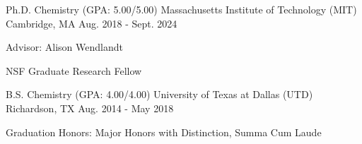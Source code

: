 

\begin{cventries}

  \cventry
    {Ph.D. Chemistry (GPA: 5.00/5.00)} %
    {Massachusetts Institute of Technology (MIT)} %
    {Cambridge, MA} %
    {Aug. 2018 - Sept. 2024} %
    {
      \begin{cvitems} %
        \item[] {Advisor: Alison Wendlandt}
        \item[] {NSF Graduate Research Fellow}
      \end{cvitems}
    }
    

\cventry
    {B.S. Chemistry (GPA: 4.00/4.00)} %
    {University of Texas at Dallas (UTD)} %
    {Richardson, TX} %
    {Aug. 2014 - May 2018} %
    {
      \begin{cvitems} %
        \item[] {Graduation Honors: Major Honors with Distinction, Summa Cum Laude}
      \end{cvitems}
    }
\end{cventries}
